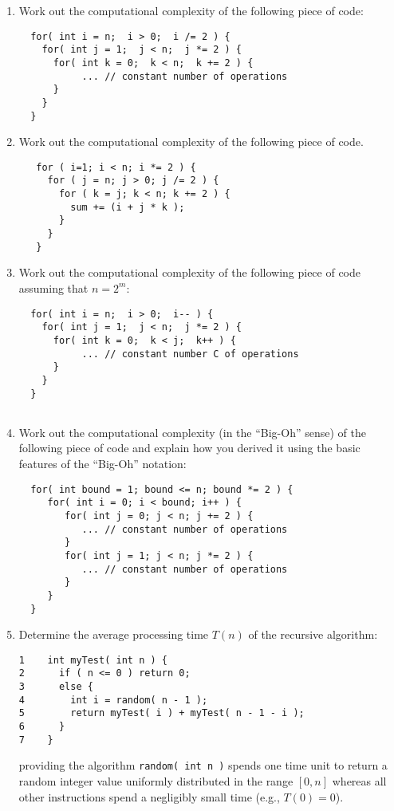 \documentclass[]{article}
\begin{document}
\begin{enumerate}

\item Work out the computational complexity of the following piece
of code:
\begin{verbatim}
  for( int i = n;  i > 0;  i /= 2 ) {
    for( int j = 1;  j < n;  j *= 2 ) {
      for( int k = 0;  k < n;  k += 2 ) {
           ... // constant number of operations
      }
    }
  } 
\end{verbatim}

\item Work out the computational complexity of the   
following piece of code.          
\begin{verbatim}           
   for ( i=1; i < n; i *= 2 ) {
     for ( j = n; j > 0; j /= 2 ) {   
       for ( k = j; k < n; k += 2 ) { 
         sum += (i + j * k );          
       }
     }
   }

\end{verbatim}     
 
\item Work out the computational complexity of the following piece
of code assuming that $n = 2^{m}$:
\begin{verbatim}
  for( int i = n;  i > 0;  i-- ) {
    for( int j = 1;  j < n;  j *= 2 ) {
      for( int k = 0;  k < j;  k++ ) {
           ... // constant number C of operations
      }
    }
  }
 
\end{verbatim}

\item Work out the computational complexity (in the 
``Big-Oh'' sense) of the following piece of code and explain
how you derived it using the basic features of the ``Big-Oh''
notation:
\begin{verbatim}
  for( int bound = 1; bound <= n; bound *= 2 ) {
     for( int i = 0; i < bound; i++ ) {
        for( int j = 0; j < n; j += 2 ) {
           ... // constant number of operations
        }
        for( int j = 1; j < n; j *= 2 ) {
           ... // constant number of operations
        }
     }
  } 

\end{verbatim}

\item Determine the average processing time \(T(n)\) 
of the recursive algorithm:
\begin{verbatim}
1    int myTest( int n ) {
2      if ( n <= 0 ) return 0;  
3      else {
4        int i = random( n - 1 );
5        return myTest( i ) + myTest( n - 1 - i ); 
6      }  
7    }
\end{verbatim}
providing the algorithm {\tt random( int n )} spends 
one time unit to return a random integer value uniformly 
distributed in the range \([0, n]\) whereas all
other instructions spend a negligibly small time (e.g., \(T(0)=0\)).
\\ 


\end{enumerate}
\end{document}
